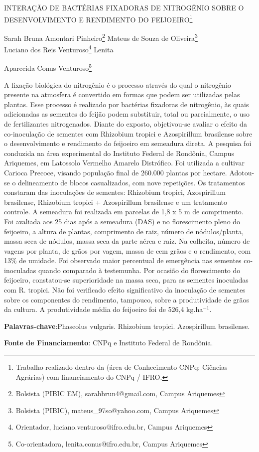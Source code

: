 \documentclass[article,12pt,onesidea,4paper,english,brazil]{abntex2}
\begin{document}
	
	
	\frenchspacing 
	
	\begin{center}
		\LARGE INTERAÇÃO DE BACTÉRIAS FIXADORAS DE NITROGÊNIO SOBRE O
		DESENVOLVIMENTO E RENDIMENTO DO FEIJOEIRO\footnote{Trabalho realizado dentro da (área de Conhecimento CNPq: Ciências Agrárias) com financiamento
			do CNPq / IFRO.}
		
		\normalsize
		Sarah Bruna Amontari Pinheiro\footnote{Bolsista (PIBIC EM), sarahbrun4@gmail.com, Campus Ariquemes} 
		Mateus de Souza de Oliveira\footnote{Bolsista (PIBIC), mateus\_97so@yahoo.com, Campus Ariquemes} \\
		Luciano dos Reis Venturoso\footnote{Orientador, luciano.venturoso@ifro.edu.br, Campus Ariquemes} 
		Lenita
		
		Aparecida Conus Venturoso\footnote{Co-orientadora, lenita.conus@ifro.edu.br, Campus Ariquemes} 
	
        
    \end{center}    
	
	\noindent A fixação biológica do nitrogênio é o processo através do qual o nitrogênio presente
	na atmosfera é convertido em formas que podem ser utilizadas pelas plantas. Esse
	processo é realizado por bactérias fixadoras de nitrogênio, às quais adicionadas as
	sementes do feijão podem substituir, total ou parcialmente, o uso de fertilizantes
	nitrogenados. Diante do exposto, objetivou-se avaliar o efeito da co-inoculação de
	sementes com Rhizobium tropici e Azospirillum brasilense sobre o desenvolvimento
	e rendimento do feijoeiro em semeadura direta. A pesquisa foi conduzida na área
	experimental do Instituto Federal de Rondônia, Campus Ariquemes, em Latossolo
	Vermelho Amarelo Distrófico. Foi utilizada a cultivar Carioca Precoce, visando
	população final de 260.000 plantas por hectare. Adotou-se o delineamento de blocos
	casualizados, com nove repetições. Os tratamentos constaram das inoculações de
	sementes: Rhizobium tropici, Azospirillum brasilense, Rhizobium tropici +
	Azospirillum brasilense e um tratamento controle. A semeadura foi realizada em
	parcelas de 1,8 x 5 m de comprimento. Foi avaliada aos 25 dias após a semeadura
	(DAS) e no florescimento pleno do feijoeiro, a altura de plantas, comprimento de raiz,
	número de nódulos/planta, massa seca de nódulos, massa seca da parte aérea e
	raiz. Na colheita, número de vagens por planta, de grãos por vagem, massa de cem
	grãos e o rendimento, com 13\% de umidade. Foi observado maior percentual de
	emergência nas sementes co-inoculadas quando comparado à testemunha. Por
	ocasião do florescimento do feijoeiro, constatou-se superioridade na massa seca,
	para as sementes inoculadas com R. tropici. Não foi verificado efeito significativo da
	inoculação de sementes sobre os componentes do rendimento, tampouco, sobre a
	produtividade de grãos da cultura. A produtividade média do feijoeiro foi de 526,4
	kg.ha$^{-1}$.
	
	\vspace{\onelineskip}
	
	\noindent
	\textbf{Palavras-chave}:Phaseolus vulgaris. Rhizobium tropici. Azospirillum brasilense.
	
	\noindent
	\textbf{Fonte de Financiamento}: CNPq e Instituto Federal de Rondônia.
	
\end{document}
